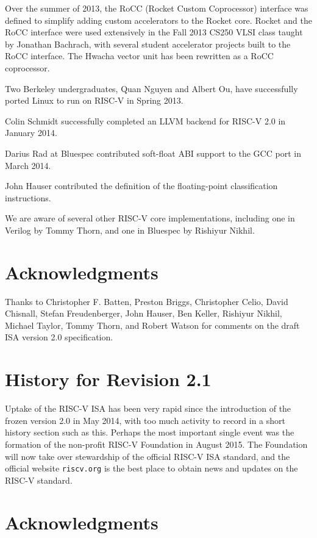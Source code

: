 Over the summer of 2013, the RoCC (Rocket Custom Coprocessor)
interface was defined to simplify adding custom accelerators to the
Rocket core.  Rocket and the RoCC interface were used extensively in
the Fall 2013 CS250 VLSI class taught by Jonathan Bachrach, with
several student accelerator projects built to the RoCC interface.  The
Hwacha vector unit has been rewritten as a RoCC coprocessor.

Two Berkeley undergraduates, Quan Nguyen and Albert Ou, have
successfully ported Linux to run on RISC-V in Spring 2013.

Colin Schmidt successfully completed an LLVM backend for RISC-V 2.0 in
January 2014.

Darius Rad at Bluespec contributed soft-float ABI support to the GCC port in
March 2014.

John Hauser contributed the definition of the floating-point classification
instructions.

We are aware of several other RISC-V core implementations, including
one in Verilog by Tommy Thorn, and one in Bluespec by Rishiyur Nikhil.

\section*{Acknowledgments}

Thanks to Christopher F. Batten, Preston Briggs, Christopher Celio, David
Chisnall, Stefan Freudenberger, John Hauser, Ben Keller, Rishiyur
Nikhil, Michael Taylor, Tommy Thorn, and Robert Watson for comments on
the draft ISA version 2.0 specification.

\section{History for Revision 2.1}

Uptake of the RISC-V ISA has been very rapid since the introduction of
the frozen version 2.0 in May 2014, with too much activity to record
in a short history section such as this.  Perhaps the most important
single event was the formation of the non-profit RISC-V Foundation in
August 2015. The Foundation will now take over stewardship of the
official RISC-V ISA standard, and the official website {\tt riscv.org}
is the best place to obtain news and updates on the RISC-V standard.

\section*{Acknowledgments}


